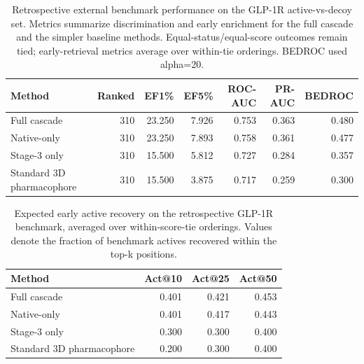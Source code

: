 \begin{table}[htbp]
\centering
\normalsize
\caption{Retrospective external benchmark performance on the GLP-1R active-vs-decoy set. Metrics summarize discrimination and early enrichment for the full cascade and the simpler baseline methods. Equal-status/equal-score outcomes remain tied; early-retrieval metrics average over within-tie orderings. BEDROC used alpha=20.}
\label{tab:benchmark_summary_core}
\setlength{\tabcolsep}{4pt}
\begin{tabular}{lrrrrrr}
\toprule
Method & Ranked & EF1\% & EF5\% & ROC-AUC & PR-AUC & BEDROC \\
\midrule
Full cascade & 310 & 23.250 & 7.926 & 0.753 & 0.363 & 0.480 \\
Native-only & 310 & 23.250 & 7.893 & 0.758 & 0.361 & 0.477 \\
Stage-3 only & 310 & 15.500 & 5.812 & 0.727 & 0.284 & 0.357 \\
Standard 3D pharmacophore & 310 & 15.500 & 3.875 & 0.717 & 0.259 & 0.300 \\
\bottomrule
\end{tabular}
\end{table}

\begin{table}[htbp]
\centering
\normalsize
\caption{Expected early active recovery on the retrospective GLP-1R benchmark, averaged over within-score-tie orderings. Values denote the fraction of benchmark actives recovered within the top-k positions.}
\label{tab:benchmark_summary_recovery}
\setlength{\tabcolsep}{4pt}
\begin{tabular}{lrrr}
\toprule
Method & Act@10 & Act@25 & Act@50 \\
\midrule
Full cascade & 0.401 & 0.421 & 0.453 \\
Native-only & 0.401 & 0.417 & 0.443 \\
Stage-3 only & 0.300 & 0.300 & 0.400 \\
Standard 3D pharmacophore & 0.200 & 0.300 & 0.400 \\
\bottomrule
\end{tabular}
\end{table}

